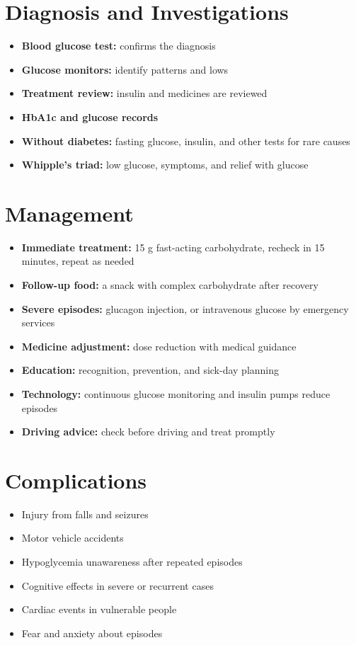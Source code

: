 \section*{Diagnosis and Investigations}
\begin{itemize}
    \item \textbf{Blood glucose test:} confirms the diagnosis
    \item \textbf{Glucose monitors:} identify patterns and lows
    \item \textbf{Treatment review:} insulin and medicines are reviewed
    \item \textbf{HbA1c and glucose records}
    \item \textbf{Without diabetes:} fasting glucose, insulin, and other tests for rare causes
    \item \textbf{Whipple's triad:} low glucose, symptoms, and relief with glucose
\end{itemize}

\section*{Management}
\begin{itemize}
    \item \textbf{Immediate treatment:} 15 g fast-acting carbohydrate, recheck in 15 minutes, repeat as needed
    \item \textbf{Follow-up food:} a snack with complex carbohydrate after recovery
    \item \textbf{Severe episodes:} glucagon injection, or intravenous glucose by emergency services
    \item \textbf{Medicine adjustment:} dose reduction with medical guidance
    \item \textbf{Education:} recognition, prevention, and sick-day planning
    \item \textbf{Technology:} continuous glucose monitoring and insulin pumps reduce episodes
    \item \textbf{Driving advice:} check before driving and treat promptly
\end{itemize}

\section*{Complications}
\begin{itemize}
    \item Injury from falls and seizures
    \item Motor vehicle accidents
    \item Hypoglycemia unawareness after repeated episodes
    \item Cognitive effects in severe or recurrent cases
    \item Cardiac events in vulnerable people
    \item Fear and anxiety about episodes
\end{itemize}

